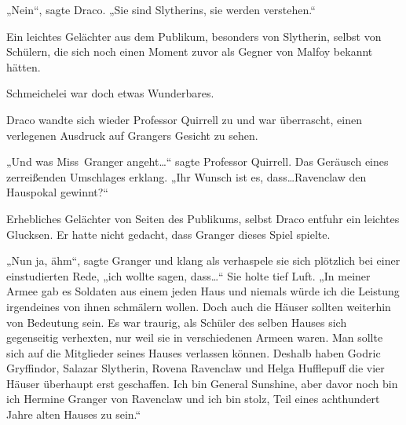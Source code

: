 „Nein“, sagte Draco. „Sie sind Slytherins, sie werden verstehen.“

Ein leichtes Gelächter aus dem Publikum, besonders von Slytherin, selbst von Schülern, die sich noch einen Moment zuvor als Gegner von Malfoy bekannt hätten.

Schmeichelei war doch etwas Wunderbares.

Draco wandte sich wieder Professor Quirrell zu und war überrascht, einen verlegenen Ausdruck auf Grangers Gesicht zu sehen.

„Und was Miss~Granger angeht…“ sagte Professor Quirrell. Das Geräusch eines zerreißenden Umschlages erklang. „Ihr Wunsch ist es, dass…Ravenclaw den Hauspokal gewinnt?“

Erhebliches Gelächter von Seiten des Publikums, selbst Draco entfuhr ein leichtes Glucksen. Er hatte nicht gedacht, dass Granger dieses Spiel spielte.

„Nun ja, ähm“, sagte Granger und klang als verhaspele sie sich plötzlich bei einer einstudierten Rede, „ich wollte sagen, dass…“ Sie holte tief Luft. „In meiner Armee gab es Soldaten aus einem jeden Haus und niemals würde ich die Leistung irgendeines von ihnen schmälern wollen. Doch auch die Häuser sollten weiterhin von Bedeutung sein. Es war traurig, als Schüler des selben Hauses sich gegenseitig verhexten, nur weil sie in verschiedenen Armeen waren. Man sollte sich auf die Mitglieder seines Hauses verlassen können. Deshalb haben Godric Gryffindor, Salazar Slytherin, Rovena Ravenclaw und Helga Hufflepuff die vier Häuser überhaupt erst geschaffen. Ich bin General Sunshine, aber davor noch bin ich Hermine Granger von Ravenclaw und ich bin stolz, Teil eines achthundert Jahre alten Hauses zu sein.“

